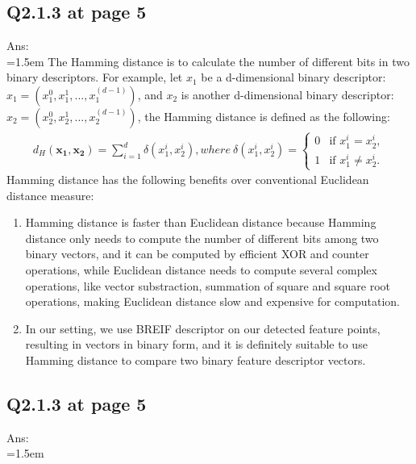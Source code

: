 \documentclass[12pt]{article}
\begin{document}
	\subsection*{Q2.1.3 at page 5}
	Ans:\\
	\hangindent=1.5em \hspace{1.5em} The Hamming distance is to calculate the number of different bits in two binary descriptors. For example, let $x_1$ be a d-dimensional binary descriptor: $x_1 = (x_1^0, x_1^1, ..., x_1^{(d-1)})$, and $x_2$ is another d-dimensional binary descriptor: $x_2 = (x_2^0, x_2^1, ..., x_2^{(d-1)})$, the Hamming distance is defined as the following:
	\begin{eqnarray}
		d_H(\mathbf{x_1}, \mathbf{x_2}) = \sum_{i=1}^{d} \delta(x_1^i, x_2^i), where\ \delta(x_1^i, x_2^i) =
		\begin{cases}
			0 & \text{if } x_1^i = x_2^i, \\
			1 & \text{if } x_1^i \neq x_2^i.
		\end{cases}
	\end{eqnarray}
	Hamming distance has the following benefits over conventional Euclidean distance measure:
	\begin{enumerate}
		\item Hamming distance is faster than Euclidean distance because Hamming distance only needs to compute the number of different bits among two binary vectors, and it can be computed by efficient XOR and counter operations, while Euclidean distance needs to compute several complex operations, like vector substraction, summation of square and square root operations, making Euclidean distance slow and expensive for computation.
		\item In our setting, we use BREIF descriptor on our detected feature points, resulting in vectors in binary form, and it is definitely suitable to use Hamming distance to compare two binary feature descriptor vectors. 
	\end{enumerate}
	
	\newpage
	\subsection*{Q2.1.3 at page 5}
	Ans:\\
	\hangindent=1.5em \hspace{1.5em}
	

	
	
	
	
	
\end{document}
